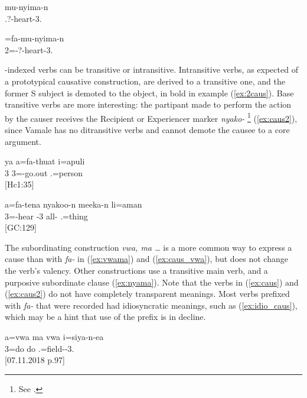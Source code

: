 	\ea \label{ex:poss2_caus}
		\gll mu-nyima-n\\ 
	 .?-heart-3.\\ 
	\glt {}
	\z 
	
	\ea
		=fa-mu-nyima-n\\ 
	 2=-?-heart-3.\\ 
	\glt {}
	\z




-indexed verbs can be transitive or intransitive. Intransitive verbs, as expected of a prototypical causative construction, are derived to a transitive one, and the former S subject is demoted to the object, in bold in example (\ref{ex:2caus}). Base transitive verbs are more interesting: the partipant made to perform the action by the causer receives the Recipient or Experiencer marker \textit{nyako-} \footnote{See .} (\ref{ex:caus2}), since Vamale has no ditransitive verbs and cannot demote the causee to a core argument.
 

\ea\label{ex:2caus}
\gll ya a=fa-thuat {i}={apuli}\\ 
 3 3=-go.out .=person \\ 
\glt {} {[Hc1:35]}
\z


\ea \label{ex:caus2}
\gll a=fa-tena nyakoo-n meeka-n li=aman\\ 
 3=-hear -3 all- .=thing\\ 
\glt {} {[GC:129]}
\z

The subordinating construction \textit{vwa, ma \ldots}  is a more common way to express a cause than with \textit{fa-}  in (\ref{ex:vwama}) and (\ref{ex:caus_vwa}), but does not change the verb's valency. Other constructions use a transitive main verb, and a purposive subordinate clause (\ref{ex:nyama}). Note that the verbs in (\ref{ex:caus}) and (\ref{ex:caus2}) do not have completely transparent meanings. Most verbs prefixed with \textit{fa-} that were recorded had idiosyncratic meanings, such as (\ref{ex:idio_caus}), which may be a hint that use of the prefix is in decline. 


\ea\label{ex:vwama}
\gll a=vwa ma vwa i=siya-n-ea\\ 
 3=do  do .=field--3.\\ 
\glt {} {[07.11.2018 p.97]}
\z

